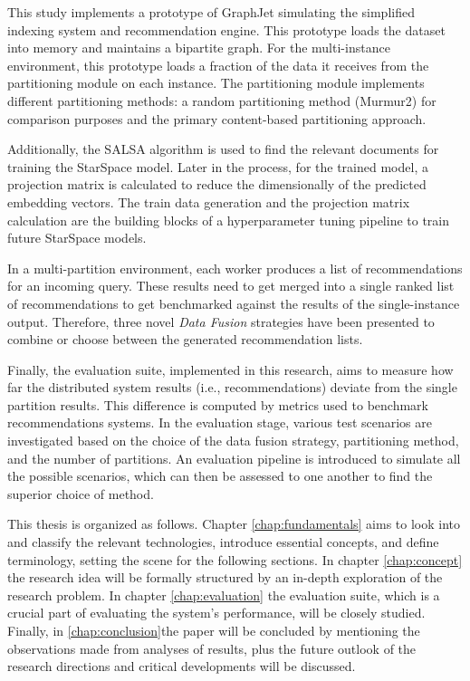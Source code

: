 This study implements a prototype of GraphJet simulating the simplified indexing system and recommendation engine. This prototype loads the dataset into memory and maintains a bipartite graph. For the multi-instance environment, this prototype loads a fraction of the data it receives from the partitioning module on each instance. The partitioning module implements different partitioning methods: a random partitioning method (Murmur2) for comparison purposes and the primary content-based partitioning approach.


Additionally, the SALSA algorithm is used to find the relevant documents for training the StarSpace model. Later in the process, for the trained model, a projection matrix is calculated to reduce the dimensionally of the predicted embedding vectors. The train data generation and the projection matrix calculation are the building blocks of a hyperparameter tuning pipeline to train future StarSpace models.


In a multi-partition environment, each worker produces a list of recommendations for an incoming query. These results need to get merged into a single ranked list of recommendations to get benchmarked against the results of the single-instance output. Therefore, three novel \emph{Data Fusion} strategies have been presented to combine or choose between the generated recommendation lists.


Finally, the evaluation suite, implemented in this research, aims to measure how far the distributed system results (i.e., recommendations) deviate from the single partition results. This difference is computed by metrics used to benchmark recommendations systems. In the evaluation stage, various test scenarios are investigated based on the choice of the data fusion strategy, partitioning method, and the number of partitions. An evaluation pipeline is introduced to simulate all the possible scenarios, which can then be assessed to one another to find the superior choice of method.


This thesis is organized as follows. Chapter \ref{chap:fundamentals} aims to look into and classify the relevant technologies, introduce essential concepts, and define terminology, setting the scene for the following sections. In chapter \ref{chap:concept} the research idea will be formally structured by an in-depth exploration of the research problem. In chapter \ref{chap:evaluation} the evaluation suite, which is a crucial part of evaluating the system's performance, will be closely studied. Finally, in \ref{chap:conclusion}the paper will be concluded by mentioning the observations made from analyses of results, plus the future outlook of the research directions and critical developments will be discussed.